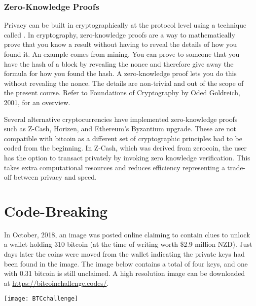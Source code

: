 \subsubsection*{Zero-Knowledge Proofs}
Privacy can be built in cryptographically at the protocol level using a technique called . In cryptography, zero-knowledge proofs are a way to mathematically prove that you know a result without having to reveal the details of how you found it. An example comes from mining. You can prove to someone that you have the hash of a block by revealing the nonce and therefore give away the formula for how you found the hash. A zero-knowledge proof lets you do this without revealing the nonce. The details are non-trivial and out of the scope of the present course. Refer to Foundations of Cryptography by Oded Goldreich, 2001, for an overview.

Several alternative cryptocurrencies have implemented zero-knowledge proofs such as Z-Cash, Horizen, and Ethereum's Byzantium upgrade. These are not compatible with bitcoin as a different set of cryptographic principles had to be coded from the beginning. In Z-Cash, which was derived from zerocoin, the user has the option to transact privately by invoking zero knowledge verification. This takes extra computational resources and reduces efficiency representing a trade-off between privacy and speed.


\section*{Code-Breaking}\label{Se:code-breaking}
In October, 2018, an image was posted online claiming to contain clues to unlock a wallet holding 310 bitcoin (at the time of writing worth \$2.9 million NZD). Just days later the coins were moved from the wallet indicating the private keys had been found in the image. The image below contains a total of four keys, and one with 0.31 bitcoin is still unclaimed. A high resolution image can be downloaded at \url{https://bitcoinchallenge.codes/}.
\begin{center}
	\texttt{[image: BTCchallenge]}
\end{center}
%
%
%
%
